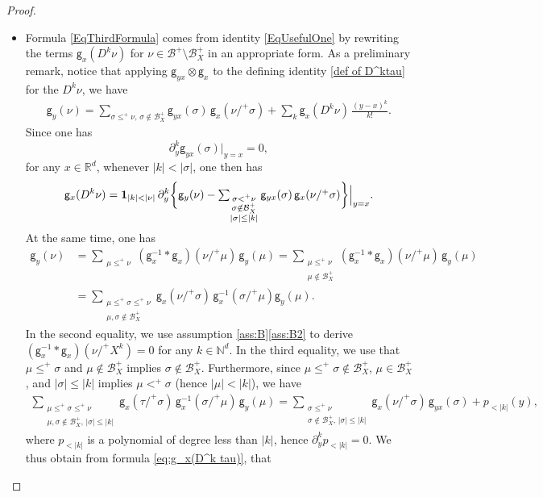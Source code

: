 \documentclass[11pt]{article}
\numberwithin{equation}{section}
\theoremstyle{plain}
\theoremstyle{definition}
\newcommand{\unit}{\mathbf{1}}
\newcommand{\sfg}{\mathsf{g}}
\newcommand{\bbN}{\mathbb{N}}
\newcommand{\bbR}{\mathbb{R}}
\newcommand{\mcB}{\mathcal{B}}
\begin{document}
\begin{proof}
\begin{itemize}
\item
Formula \eqref{EqThirdFormula} comes from identity \eqref{EqUsefulOne} by rewriting the terms ${\sfg}_x(D^k\nu)$ for $\nu\in\mcB^+\setminus\mcB_X^+$ in an appropriate form. As a preliminary remark, notice that applying $\sfg_{yx}\otimes\sfg_x$ to the defining identity \eqref{def of D^ktau} for the $D^k\nu$, we have
\begin{align*}
\sfg_y(\nu) = \sum_{\sigma\leq^+\nu,\, \sigma\notin\mcB_X^+} \sfg_{yx}(\sigma)\,\sfg_x(\nu/^+\sigma) + \sum_k\sfg_x(D^k\nu)\,\frac{(y-x)^k}{k!}.
\end{align*}
Since one has
\[
\partial_y^k\sfg_{yx}(\sigma)\big|_{y=x} = 0,
\]
for any $x\in\bbR^d$, whenever $|k| < |\sigma|$, one then has
\begin{align}\label{eq:g_x(D^k tau)}
{\sf g}_x(D^k\nu) = \unit_{|k|<|\nu|}\, \partial_y^k\bigg\{\sfg_y(\nu) - \textstyle\sum_{\substack{\sigma<^+\nu\\\sigma\notin\mcB_X^+\\|\sigma| \leq |k|}} \sfg_{yx}(\sigma)\,\sfg_x(\nu/^+\sigma)\bigg\}\Big|_{y=x}.
\end{align}
At the same time, one has
\begin{align*}
\sfg_y(\nu) &= \sum_{\substack{\mu\le^+\nu}} (\sfg_x^{-1}*\sfg_x)(\nu/^+\mu)\,\sfg_y(\mu) = \sum_{\substack{\mu\le^+\nu \\ \mu\notin\mcB_X^+}} (\sfg_x^{-1}*\sfg_x)(\nu/^+\mu)\,\sfg_y(\mu) \\
&= \sum_{\substack{\mu\le^+\sigma\le^+\nu \\ \mu,\sigma\notin\mcB_X^+}} \sfg_x(\nu/^+\sigma)\,\sfg_x^{-1}(\sigma/^+\mu)\sfg_y(\mu).
\end{align*}
In the second equality, we use assumption \ref{ass:B}\eqref{ass:B2} to derive $(\sfg_x^{-1}*\sfg_x)(\nu/^+X^k)=0$ for any $k\in\bbN^d$.
In the third equality, we use that $\mu\le^+\sigma$ and $\mu\notin\mcB_X^+$ implies $\sigma\notin\mcB_X^+$. Furthermore, since $\mu\le^+\sigma\notin\mcB_X^+$, $\mu\in\mcB_X^+$, and $|\sigma|\le |k|$ implies $\mu<^+\sigma$ (hence $|\mu|<|k|$), we have
\begin{align*}
\sum_{\substack{\mu\le^+\sigma\le^+\nu \\ \mu,\sigma\notin\mcB_X^+,\,|\sigma|\le|k|}} \sfg_x(\tau/^+\sigma)\,\sfg_x^{-1}(\sigma/^+\mu)\,\sfg_y(\mu) = \sum_{\substack{\sigma\le^+\nu \\ \sigma\notin\mcB_X^+,\,|\sigma|\le|k|}} \sfg_x(\nu/^+\sigma)\,\sfg_{yx}(\sigma)+p_{<|k|}(y),
\end{align*}
where $p_{<|k|}$ is a polynomial of degree less than $|k|$, hence $\partial^k_yp_{<|k|}=0$. We thus obtain from formula \eqref{eq:g_x(D^k tau)}, that

\end{itemize}
\end{proof}
\end{document}
